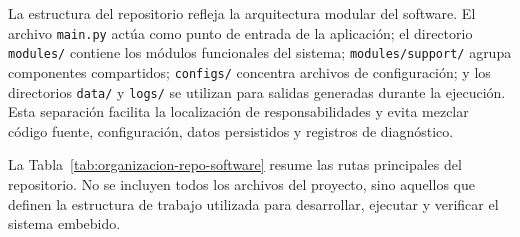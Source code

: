 La estructura del repositorio refleja la arquitectura modular del software. El archivo \texttt{main.py} actúa como punto de entrada de la aplicación; el directorio \texttt{modules/} contiene los módulos funcionales del sistema; \texttt{modules/support/} agrupa componentes compartidos; \texttt{configs/} concentra archivos de configuración; y los directorios \texttt{data/} y \texttt{logs/} se utilizan para salidas generadas durante la ejecución. Esta separación facilita la localización de responsabilidades y evita mezclar código fuente, configuración, datos persistidos y registros de diagnóstico.

La Tabla~\ref{tab:organizacion-repo-software} resume las rutas principales del repositorio. No se incluyen todos los archivos del proyecto, sino aquellos que definen la estructura de trabajo utilizada para desarrollar, ejecutar y verificar el sistema embebido.

